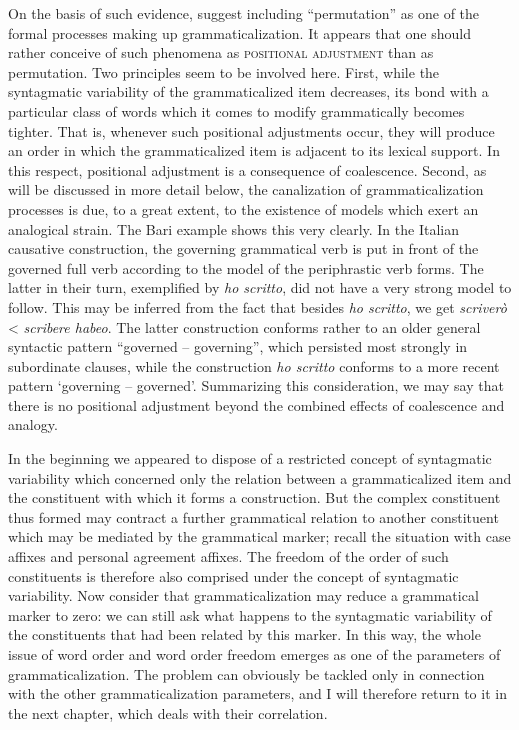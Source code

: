 On the basis of such evidence, \citeauthor{HeineEtAl1984} suggest including ``permutation'' as one of the formal processes making up grammaticalization. It appears that one should rather conceive of such phenomena as \textsc{positional adjustment} than as permutation. Two principles seem to be involved here. First, while the syntagmatic variability of the grammaticalized item decreases, its bond with a particular class of words which it comes to modify grammatically becomes tighter. That is, whenever such positional adjustments occur, they will produce an order in which the grammaticalized item is adjacent to its lexical support. In this respect, positional adjustment is a consequence of coalescence. Second, as will be discussed in more detail below, the canalization of grammaticalization processes is due, to a great extent, to the existence of models which exert an analogical strain. The Bari example shows this very clearly. In the Italian causative construction, the governing grammatical verb is put in front of the governed full verb according to the model of the periphrastic verb forms. The latter in their turn, exemplified by \textit{ho scritto}, did not have a very strong model to follow. This may be inferred from the fact that besides \textit{ho scritto}, we get \textit{scriverò} {\textless} \textit{scribere habeo}. The latter construction conforms rather to an older general syntactic pattern ``governed -- governing'', which persisted most strongly in subordinate clauses, while the construction \textit{ho scritto} conforms to a more recent pattern ‘governing -- governed’. Summarizing this consideration, we may say that there is no positional adjustment beyond the combined effects of coalescence and analogy.%

In the beginning we appeared to dispose of a restricted concept of syntagmatic variability which concerned only the relation between a grammaticalized item and the constituent with which it forms a construction. But the complex constituent thus formed may contract a further grammatical relation to another constituent which may be mediated by the grammatical marker; recall the situation with case affixes and personal agreement affixes. The freedom of the order of such constituents is therefore also comprised under the concept of syntagmatic variability. Now consider that grammaticalization may reduce a grammatical marker to zero: we can still ask what happens to the syntagmatic variability of the constituents that had been related by this marker. In this way, the whole issue of word order and word order freedom emerges as one of the parameters of grammaticalization. The problem can obviously be tackled only in connection with the other grammaticalization parameters, and I will therefore return to it in the next chapter, which deals with their correlation.


